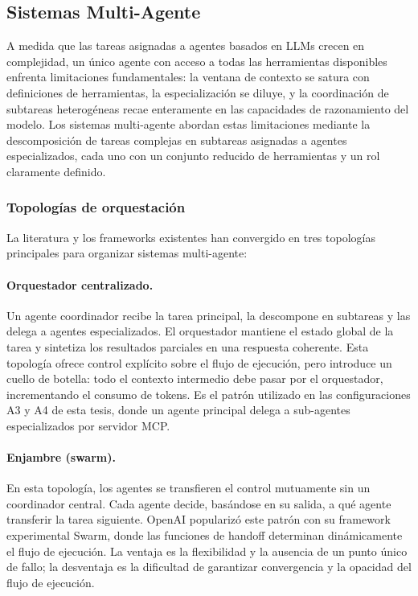 \subsection{Sistemas Multi-Agente}

A medida que las tareas asignadas a agentes basados en LLMs crecen en
complejidad, un único agente con acceso a todas las herramientas disponibles
enfrenta limitaciones fundamentales: la ventana de contexto se satura con
definiciones de herramientas, la especialización se diluye, y la coordinación
de subtareas heterogéneas recae enteramente en las capacidades de razonamiento
del modelo. Los sistemas multi-agente abordan estas limitaciones mediante la
descomposición de tareas complejas en subtareas asignadas a agentes
especializados, cada uno con un conjunto reducido de herramientas y un rol
claramente definido.

\subsubsection{Topologías de orquestación}

La literatura y los frameworks existentes han convergido en tres topologías
principales para organizar sistemas multi-agente:

\paragraph{Orquestador centralizado.} Un agente coordinador recibe la tarea
principal, la descompone en subtareas y las delega a agentes especializados. El
orquestador mantiene el estado global de la tarea y sintetiza los resultados
parciales en una respuesta coherente. Esta topología ofrece control explícito
sobre el flujo de ejecución, pero introduce un cuello de botella: todo el
contexto intermedio debe pasar por el orquestador, incrementando el consumo de
tokens. Es el patrón utilizado en las configuraciones A3 y A4 de esta tesis,
donde un agente principal delega a sub-agentes especializados por servidor MCP.

\paragraph{Enjambre (swarm).} En esta topología, los agentes se transfieren el
control mutuamente sin un coordinador central. Cada agente decide, basándose en
su salida, a qué agente transferir la tarea siguiente. OpenAI popularizó este
patrón con su framework experimental Swarm, donde las funciones de handoff
determinan dinámicamente el flujo de ejecución. La ventaja es la flexibilidad y
la ausencia de un punto único de fallo; la desventaja es la dificultad de
garantizar convergencia y la opacidad del flujo de ejecución.

